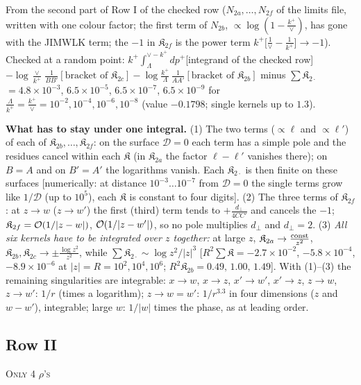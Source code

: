 \documentclass[9pt]{article}
\numberwithin{equation}{section}
\begin{document}
{\color{gray}\small From the second part of Row I of the checked row ($N_{2a},\dots,N_{2f}$ of the limits file, written with one colour factor; the first term of $N_{2b}$, $\propto\log(1-\frac{k^{+}}{\vee})$, has gone with the JIMWLK term; the $-1$ in $\mathfrak{K}_{2f}$ is the power term $k^{+}\big[\frac{1}{\vee}-\frac{1}{k^{+}}\big]\to-1$). Checked at a random point: $k^{+}\int_{\Lambda}^{\vee-k^{+}}dp^{+}$[integrand of the checked row] $-\log\frac{\vee}{k^{+}}\,\frac{1}{BB'}[\text{bracket of }\mathfrak{K}_{2c}]-\log\frac{k^{+}}{\Lambda}\,\frac{1}{AA'}[\text{bracket of }\mathfrak{K}_{2b}]$ minus $\sum\mathfrak{K}_{2\cdot}$ $=4.8\times10^{-3}$, $6.5\times10^{-5}$, $6.5\times10^{-7}$, $6.5\times10^{-9}$ for $\frac{\Lambda}{k^{+}}=\frac{k^{+}}{\vee}=10^{-2},10^{-4},10^{-6},10^{-8}$ (value $-0.1798$; single kernels up to $1.3$).}\par
\noindent\textbf{What has to stay under one integral.} (1) The two terms ($\propto\ell$ and $\propto\ell'$) of each of $\mathfrak{K}_{2b},\dots,\mathfrak{K}_{2f}$: on the surface $\mathcal{D}=0$ each term has a simple pole and the residues cancel within each $\mathfrak{K}$ (in $\mathfrak{K}_{2a}$ the factor $\ell-\ell'$ vanishes there); on $B=A$ and on $B'=A'$ the logarithms vanish. Each $\mathfrak{K}_{2\cdot}$ is then finite on these surfaces [numerically: at distance $10^{-3}\dots10^{-7}$ from $\mathcal{D}=0$ the single terms grow like $1/\mathcal{D}$ (up to $10^{5}$), each $\mathfrak{K}$ is constant to four digits]. (2) The three terms of $\mathfrak{K}_{2f}$: at $z\to w$ ($z\to w'$) the first (third) term tends to $+\frac{d_{\perp}}{4CC'}$ and cancels the $-1$; $\mathfrak{K}_{2f}={\cal O}(1/|z-w|)$, ${\cal O}(1/|z-w'|)$, so no pole multiplies $d_{\perp}$ and $d_{\perp}=2$. (3) \emph{All six kernels have to be integrated over $z$ together:} at large $z$, $\mathfrak{K}_{2a}\to\frac{\rm const}{z^{2}}$, $\mathfrak{K}_{2b},\mathfrak{K}_{2c}\to\pm\frac{\log z^{2}}{z^{2}}$, while $\sum\mathfrak{K}_{2\cdot}\sim\log z^{2}/|z|^{3}$ [$R^{2}\sum\mathfrak{K}=-2.7\times10^{-2}$, $-5.8\times10^{-4}$, $-8.9\times10^{-6}$ at $|z|=R=10^{2},10^{4},10^{6}$; $R^{2}\mathfrak{K}_{2b}=0.49,\,1.00,\,1.49$]. With (1)--(3) the remaining singularities are integrable: $x\to w$, $x\to z$, $x'\to w'$, $x'\to z$, $z\to w$, $z\to w'$: $1/r$ (times a logarithm); $z\to w=w'$: $1/r^{3.3}$ in four dimensions ($z$ and $w-w'$), integrable; large $w$: $1/|w|$ times the phase, as at leading order.
\subsection{Row II}
\textsc{Only 4 $\rho$'s}
\end{document}
